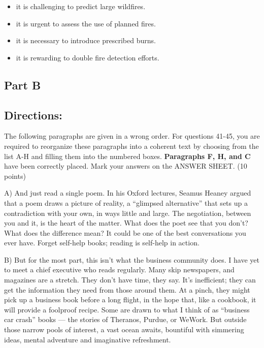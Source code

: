\documentclass[UTF8,11pt]{ctexart}
\begin{document}
\begin{itemize}[leftmargin=2em,itemsep=.2em,topsep=.4em]\item[A.] it is challenging to predict large wildfires.
\item[B.] it is urgent to assess the use of planned fires.
\item[C.] it is necessary to introduce prescribed burns.
\item[D.] it is rewarding to double fire detection efforts.
\end{itemize}

\subsection*{\textbf{Part B}}


\subsection*{\textbf{Directions:}}


The following paragraphs are given in a wrong order. For questions 41-45, you are required to reorganize these paragraphs into a coherent text by choosing from the list A-H and filling them into the numbered boxes. \textbf{Paragraphs F, H, and C} have been correctly placed. Mark your answers on the ANSWER SHEET. (10 points)


A) And just read a single poem. In his Oxford lectures, Seamus Heaney argued that a poem draws a picture of reality, a “glimpsed alternative” that sets up a contradiction with your own, in ways little and large. The negotiation, between you and it, is the heart of the matter. What does the poet see that you don’t? What does the difference mean? It could be one of the best conversations you ever have. Forget self-help books; reading is self-help in action.


B) But for the most part, this isn’t what the business community does. I have yet to meet a chief executive who reads regularly. Many skip newspapers, and magazines are a stretch. They don’t have time, they say. It’s inefficient; they can get the information they need from those around them. At a pinch, they might pick up a business book before a long flight, in the hope that, like a cookbook, it will provide a foolproof recipe. Some are drawn to what I think of as “business car crash” books — the stories of Theranos, Purdue, or WeWork. But outside those narrow pools of interest, a vast ocean awaits, bountiful with simmering ideas, mental adventure and imaginative refreshment.
\end{document}

